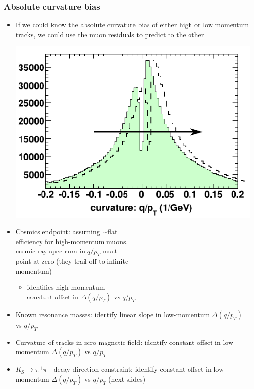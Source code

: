 \documentclass[compress]{beamer}
\begin{document}
\begin{frame}
\frametitle{Absolute curvature bias}
\begin{itemize}
\item If we could know the absolute curvature bias of either high or
  low momentum tracks, we could use the muon residuals to predict
  to the other

\hfill \includegraphics[width=0.4\linewidth]{biases.pdf}

\vspace{-3 cm}
\item Cosmics endpoint: assuming $\sim$flat \\ efficiency for
  high-momentum muons, \\ cosmic ray spectrum in $q/p_T$ must \\ point at
  zero (they trail off to infinite \\ momentum)
\begin{itemize}
\item identifies high-momentum \\ constant offset in $\Delta(q/p_T)$ vs $q/p_T$
\end{itemize}

\item Known resonance masses: identify linear slope in low-momentum $\Delta(q/p_T)$ vs $q/p_T$

\item Curvature of tracks in zero magnetic field: identify constant offset in low-momentum $\Delta(q/p_T)$ vs $q/p_T$

\item $K_S \to \pi^+\pi^-$ decay direction constraint: identify constant offset in low-momentum $\Delta(q/p_T)$ vs $q/p_T$ (next slides)
\end{itemize}
\end{frame}
\end{document}

